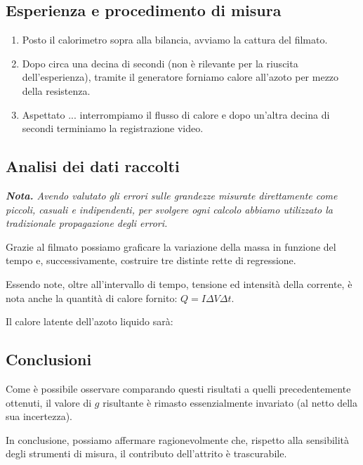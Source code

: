 \documentclass{article}
\begin{document}
\subsection{Esperienza e procedimento di misura}

\begin{enumerate}
  \item
    Posto il calorimetro sopra alla bilancia, avviamo la cattura del filmato.
  \item
    Dopo circa una decina di secondi (non è rilevante per la riuscita dell'esperienza),
    tramite il generatore forniamo calore all'azoto per mezzo della resistenza.
  \item
    Aspettato ... interrompiamo il flusso di calore e dopo
    un'altra decina di secondi terminiamo la registrazione video.
\end{enumerate}

\subsection{Analisi dei dati raccolti}
\emph{\textbf{Nota.}
Avendo valutato gli errori sulle grandezze misurate direttamente
come piccoli, casuali e indipendenti, per svolgere ogni calcolo
abbiamo utilizzato la tradizionale propagazione degli errori.
}

  Grazie al filmato possiamo graficare la variazione della massa in funzione del tempo
  e, successivamente, costruire tre distinte rette di regressione.

  Essendo note, oltre all'intervallo di tempo, tensione ed intensità della corrente,
  è nota anche la quantità di calore fornito: $Q = I \Delta V \Delta t$.

  Il calore latente dell'azoto liquido sarà:

\subsection{Conclusioni}

Come è possibile osservare comparando questi risultati a
quelli precedentemente ottenuti, il valore di $g$ risultante
è rimasto essenzialmente invariato (al netto della sua incertezza).

In conclusione, possiamo affermare ragionevolmente che,
rispetto alla sensibilità degli strumenti di misura,
il contributo dell'attrito è trascurabile.
\end{document}
